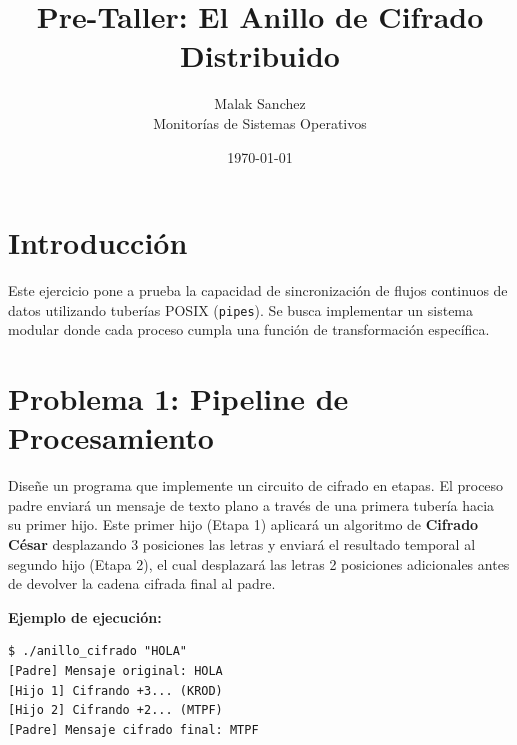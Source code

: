 \documentclass[12pt,a4paper]{article}
\title{\textbf{Pre-Taller: El Anillo de Cifrado Distribuido}}
\author{Malak Sanchez \\ \small Monitorías de Sistemas Operativos}
\date{\today}
\begin{document}
\maketitle

\section*{Introducción}
Este ejercicio pone a prueba la capacidad de sincronización de flujos continuos de datos utilizando tuberías POSIX (\texttt{pipes}). Se busca implementar un sistema modular donde cada proceso cumpla una función de transformación específica.

\section*{Problema 1: Pipeline de Procesamiento}
Diseñe un programa que implemente un circuito de cifrado en etapas. El proceso padre enviará un mensaje de texto plano a través de una primera tubería hacia su primer hijo. Este primer hijo (Etapa 1) aplicará un algoritmo de \textbf{Cifrado César} desplazando 3 posiciones las letras y enviará el resultado temporal al segundo hijo (Etapa 2), el cual desplazará las letras 2 posiciones adicionales antes de devolver la cadena cifrada final al padre.

\begin{center}
\end{center}

\textbf{Ejemplo de ejecución:} 
\begin{lstlisting}[numbers=none]
$ ./anillo_cifrado "HOLA"
[Padre] Mensaje original: HOLA
[Hijo 1] Cifrando +3... (KROD)
[Hijo 2] Cifrando +2... (MTPF)
[Padre] Mensaje cifrado final: MTPF
\end{lstlisting}
\end{document}
